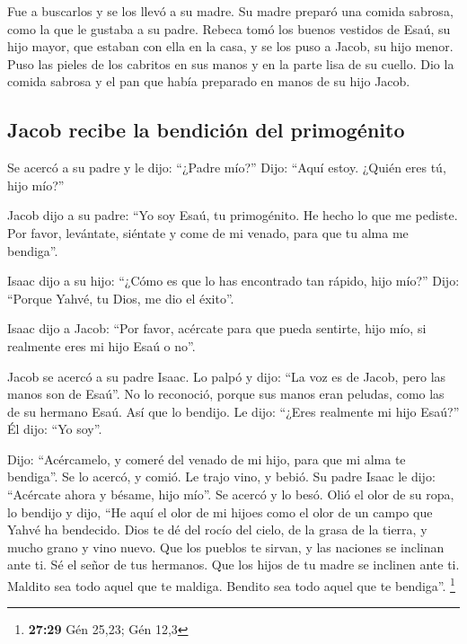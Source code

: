  Fue a buscarlos y se los llevó a su madre. Su madre
preparó una comida sabrosa, como la que le gustaba a su padre.
 Rebeca tomó los buenos vestidos de Esaú, su hijo mayor,
que estaban con ella en la casa, y se los puso a Jacob, su hijo menor.
 Puso las pieles de los cabritos en sus manos y en la
parte lisa de su cuello.  Dio la comida sabrosa y el pan
que había preparado en manos de su hijo Jacob.

\hypertarget{jacob-recibe-la-bendiciuxf3n-del-primoguxe9nito}{%
\subsection{Jacob recibe la bendición del
primogénito}\label{jacob-recibe-la-bendiciuxf3n-del-primoguxe9nito}}

 Se acercó a su padre y le dijo: ``¿Padre mío?'' Dijo:
``Aquí estoy. ¿Quién eres tú, hijo mío?''

 Jacob dijo a su padre: ``Yo soy Esaú, tu primogénito. He
hecho lo que me pediste. Por favor, levántate, siéntate y come de mi
venado, para que tu alma me bendiga''.

 Isaac dijo a su hijo: ``¿Cómo es que lo has encontrado
tan rápido, hijo mío?'' Dijo: ``Porque Yahvé, tu Dios, me dio el
éxito''.

 Isaac dijo a Jacob: ``Por favor, acércate para que pueda
sentirte, hijo mío, si realmente eres mi hijo Esaú o no''.

 Jacob se acercó a su padre Isaac. Lo palpó y dijo: ``La
voz es de Jacob, pero las manos son de Esaú''.  No lo
reconoció, porque sus manos eran peludas, como las de su hermano Esaú.
Así que lo bendijo.  Le dijo: ``¿Eres realmente mi hijo
Esaú?'' Él dijo: ``Yo soy''.

 Dijo: ``Acércamelo, y comeré del venado de mi hijo, para
que mi alma te bendiga''. Se lo acercó, y comió. Le trajo vino, y bebió.
 Su padre Isaac le dijo: ``Acércate ahora y bésame, hijo
mío''.  Se acercó y lo besó. Olió el olor de su ropa, lo
bendijo y dijo, ``He aquí el olor de mi hijoes como el olor de un campo
que Yahvé ha bendecido.  Dios te dé del rocío del cielo,
de la grasa de la tierra, y mucho grano y vino nuevo. 
Que los pueblos te sirvan, y las naciones se inclinan ante ti. Sé el
señor de tus hermanos. Que los hijos de tu madre se inclinen ante ti.
Maldito sea todo aquel que te maldiga. Bendito sea todo aquel que te
bendiga''. \footnote{\textbf{27:29} Gén 25,23; Gén 12,3}

